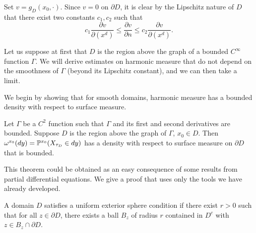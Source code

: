 Set $v = g_D(x_0,\cdot)$. Since $v = 0$ on $\partial D$, it is clear by the Lipschitz nature of $D$ that there exist two constants $c_1,c_2$ such that
\begin{equation}\label{eq:ch3_5.1}
    c_1\frac{\partial v}{\partial(x^d)} \leq \frac{\partial v}{\partial n} \leq c_2\frac{\partial v}{\partial(x^d)}.
\end{equation}

Let us suppose at first that $D$ is the region above the graph of a bounded $C^\infty$ function $\Gamma$. We will derive estimates on harmonic measure that do not depend on the smoothness of $\Gamma$ (beyond its Lipschitz constant), and we can then take a limit.

We begin by showing that for smooth domains, harmonic measure has a bounded density with respect to surface measure.

\begin{theorem}\label{thm:ch3_5.2}
Let $\Gamma$ be a $C^2$ function such that $\Gamma$ and its first and second derivatives are bounded. Suppose $D$ is the region above the graph of $\Gamma$, $x_0 \in D$. Then $\omega^{x_0}(dy) = \P^{x_0}(X_{\tau_D} \in dy)$ has a density with respect to surface measure on $\partial D$ that is bounded.
\end{theorem}

This theorem could be obtained as an easy consequence of some results from partial differential equations. We give a proof that uses only the tools we have already developed.

A domain $D$ satisfies a uniform exterior sphere condition if there exist $r > 0$ such that for all $z \in \partial D$, there exists a ball $B_z$ of radius $r$ contained in $D^c$ with $z \in B_z \cap \partial D$.


